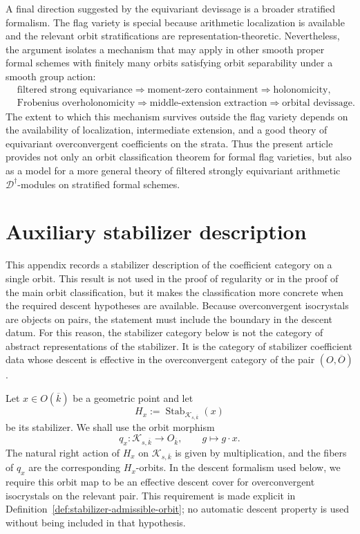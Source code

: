 \documentclass[11pt]{amsart}
\theoremstyle{plain}
\theoremstyle{definition}
\theoremstyle{remark}
\begin{document}
A final direction suggested by the equivariant devissage is a broader stratified
formalism.  The flag variety is special because arithmetic localization is
available and the relevant orbit stratifications are representation-theoretic.
Nevertheless, the argument isolates a mechanism that may apply in other smooth
proper formal schemes with finitely many orbits satisfying orbit separability under a smooth group action:
\[
\begin{aligned}
  &\text{filtered strong equivariance}
  \Longrightarrow \text{moment-zero containment}
  \Longrightarrow \text{holonomicity},\\
  &\text{Frobenius overholonomicity}
  \Longrightarrow \text{middle-extension extraction}
  \Longrightarrow \text{orbital devissage}.
\end{aligned}
\]
The extent to which this mechanism survives outside the flag variety depends
on the availability of localization, intermediate extension, and a good theory
of equivariant overconvergent coefficients on the strata.  Thus the present
article provides not only an orbit classification theorem for formal
flag varieties, but also as a model for a more general theory of filtered strongly
equivariant arithmetic \(\mathscr D^\dagger\)-modules on stratified formal
schemes.

\appendix
\section{Auxiliary stabilizer description}
\label{app:stabilizer-description}
\label{subsec:stabilizer-description}

This appendix records a stabilizer description of the coefficient category on a single
orbit.  This result is not used in the proof of regularity or in the proof of
the main orbit classification, but it makes the classification more concrete
when the required descent hypotheses are available.  Because overconvergent isocrystals are
objects on pairs, the statement must include the boundary in the descent datum.
For this reason, the stabilizer category below is not the category of abstract
representations of the stabilizer.  It is the category of stabilizer coefficient
data whose descent is effective in the overconvergent category of the pair
\((O,\overline O)\).

Let \(x\in O(\overline{k})\) be a geometric point and let
\[
  H_x:=\operatorname{Stab}_{\mathcal K_{s,\overline k}}(x)
\]
be its stabilizer.  We shall use the orbit morphism
\[
  q_x:
  \mathcal K_{s,\overline{k}}
  \longrightarrow
  O_{\overline{k}},
  \qquad
  g\longmapsto g\cdot x.
\]
The natural right action of \(H_x\) on \(\mathcal K_{s,\overline k}\) is given
by multiplication, and the fibers of \(q_x\) are the corresponding
\(H_x\)-orbits.  In the descent formalism used below, we require this orbit map
to be an effective descent cover for overconvergent isocrystals on the relevant
pair.  This requirement is made explicit in
Definition~\ref{def:stabilizer-admissible-orbit}; no automatic descent property
is used without being included in that hypothesis.
\end{document}

